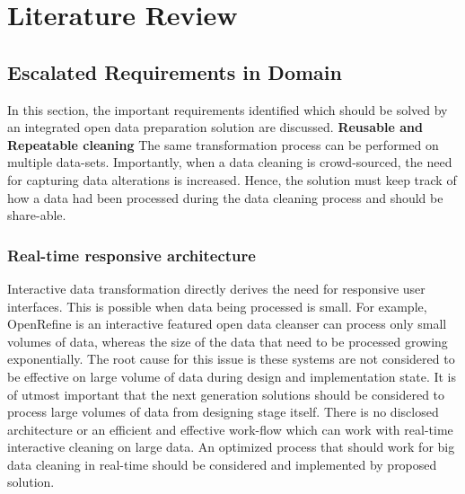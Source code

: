 
\chapter{Literature Review} %
\label{Chapter2} %


\section{Escalated Requirements in Domain}
\label{sec:requirements}
In this section, the important requirements identified which should be solved by an integrated open data preparation solution are discussed. 
\textbf{Reusable and Repeatable cleaning }
The same transformation process can be performed on multiple data-sets. Importantly, when a data cleaning is crowd-sourced, the need for capturing data alterations is increased\cite{2011-wrangler}.  Hence, the solution must keep track of how a data had been processed during the data cleaning process and should be share-able. 

\subsection{Real-time responsive architecture}
\noindent Interactive data transformation directly derives the need for responsive user interfaces. This is possible when data being processed is small. For example, OpenRefine \cite{openrefine}  is an interactive featured open data cleanser can process only small volumes of data, whereas the size of the data that need to be processed growing exponentially. The root cause for this issue is these systems are not considered to be effective on large volume of data during design and implementation state. It is of utmost important that the next generation solutions should be considered to process large volumes of data from designing stage itself. There is no disclosed architecture or an efficient and effective work-flow which can work with real-time interactive cleaning on large data.  An optimized process that should work for big data cleaning in real-time should be considered and implemented by proposed solution. 
